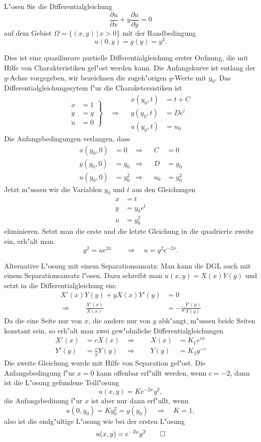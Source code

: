 L"osen Sie die Differentialgleichung
\[
\frac{\partial u}{\partial x}+y\frac{\partial u}{\partial y}=0
\]
auf dem Gebiet $\Omega=\{(x,y)\,|\, x> 0\}$ mit der Randbedingung
\[
u(0,y)=g(y)=y^2.
\]

\begin{loesung}
Dies ist eine quasilineare partielle Differentialgleichung
erster Ordnung, die mit Hilfe von Charakteristiken gel"ost werden
kann.
Die Anfangskurve ist entlang der $y$-Achse vorgegeben, wir bezeichnen
die zugeh"origen $y$-Werte mit $y_0$.
Das Differentialgleichungssytem f"ur die  Charaketersistiken ist
\[
\left.
\begin{aligned}
\dot x&=1\\
\dot y&=y\\
\dot u&=0
\end{aligned}
\right\}\quad\Rightarrow\quad
\begin{aligned}
x(y_0,t)&=t+C\\
y(y_0,t)&=De^t\\
u(y_0,t)&=u_0
\end{aligned}
\]
Die Anfangsbedingungen verlangen, dass
\begin{align*}
x(y_0,0)&=0&\Rightarrow&&C&=0\\
y(y_0,0)&=y_0&\Rightarrow&&D&=y_0\\
u(y_0,0)&=y_0^2&\Rightarrow&&u_0&=y_0^2
\end{align*}
Jetzt m"ussen wir die Variablen $y_0$ und $t$ aus den Gleichungen
\begin{align*}
x&=t\\
y&=y_0e^t\\
u&=y_0^2
\end{align*}
eliminieren. Setzt man die erste und die letzte Gleichung in die
quadrierte zweite ein, erh"alt man
\[
y^2=ue^{2x}\qquad\Rightarrow\quad u=y^2e^{-2x}.
\]

Alternative L"osung mit einem Separationsansatz: Man kann die DGL auch
mit einem Separationsansatz l"osen. Dazu schreibt man $u(x,y)=X(x)Y(y)$
und setzt in die Differentialgleichung ein:
\begin{align*}
X'(x)Y(y)+yX(x)Y'(y)&=0\\
\Rightarrow\qquad \frac{X'(x)}{X(x)}&=-y\frac{Y'(y)}{Y(y)}
\end{align*}
Da die eine Seite nur von $x$, die andere nur von $y$ abh"angt, m"ussen
beide Seiten konstant sein, so erh"alt man zwei gew"ohnliche
Differentialgleichungen
\begin{align*}
X'(x)&=cX(x)&\Rightarrow\qquad X(x)&=K_1e^{cx}\\
Y'(y)&=\frac{c}{y}Y(y)&\Rightarrow\qquad Y(y)&=K_2y^{-c}
\end{align*}
Die zweite Gleichung wurde mit Hilfe von Separation gel"ost.
Die Anfangsbedingung f"ur $x=0$ kann offenbar erf"ullt werden,
wenn $c=-2$, dann ist die L"osung gefundene Teill"osung
\[
u(x,y)=Ke^{-2x}y^2,
\]
die Anfangsbedinung f"ur $x$ ist aber nur dann erf"ullt, wenn
\[
u(0,y_0)=Ky_0^2=g(y_0)\quad\Rightarrow\quad K=1,
\]
also ist die endg"ultige L"osung wie bei der ersten L"osung
\[
u(x,y)=e^{-2x}y^2
\qedhere
\]
\end{loesung}
